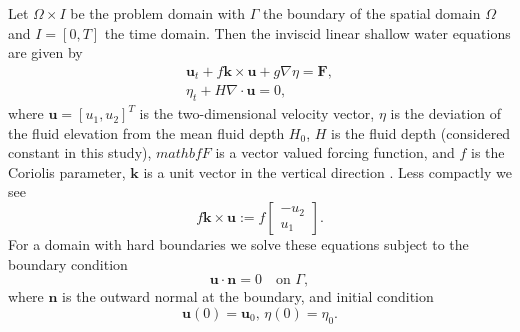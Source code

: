 Let $\Omega \times I$ be the problem domain with $\Gamma$ the boundary of the
spatial domain $\Omega$ and $I = [0, T]$ the time domain.  Then the inviscid
linear shallow water equations are given by
\begin{equation}
  \begin{split}
    \mathbf{u}_t + f\mathbf{k} \times \mathbf{u} + g \nabla \eta = \mathbf{F}, \\
    \eta_t + H \nabla\cdot \mathbf{u} = 0,
  \end{split}
  \label{eqn:SWE}
\end{equation}
where $\mathbf{u}=[u_1,u_2]^T$ is the two-dimensional velocity vector, $\eta$ is the
deviation of the fluid elevation from the mean fluid depth $H_0$, $H$ is the
fluid depth (considered constant in this study), $mathbf{F}$ is a vector valued
forcing function, and $f$ is the Coriolis parameter, $\mathbf{k}$ is a unit
vector in the vertical direction \cite{Hanert2004, LeBlond1981, Le-Roux1998}.
Less compactly we see
\begin{equation}
  f\mathbf{k} \times \mathbf{u} := f\begin{bmatrix}
    -u_2 \\
    u_1
  \end{bmatrix}.
  \label{eqn:Coriolis}
\end{equation}
For a domain with hard boundaries
we solve these equations subject to the boundary condition
\begin{equation}
  \mathbf{u}\cdot \mathbf{n} = 0 \quad \text{on } \Gamma,
  \label{eqn:BCs}
\end{equation}
where $\mathbf{n}$ is the outward normal at the boundary,
and initial condition
\begin{equation}
  \mathbf{u}(0) = \mathbf{u}_0,\, \eta(0) = \eta_0.
  \label{eqn:IC}
\end{equation}

